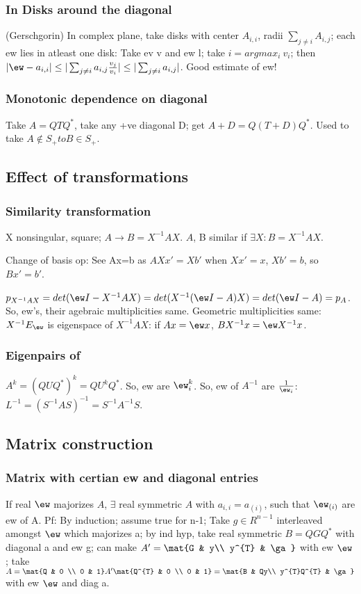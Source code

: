 \documentclass[oneside, article]{memoir}
\begin{document}
\subsubsection{In Disks around the diagonal}
(Gerschgorin) In complex plane, take disks with center $A_{i,i}$, radii $\sum_{j\neq i} A_{i,j}$; each ew lies in atleast one disk: Take ev v and ew l; take $i = argmax_{i}\ v_{i}$; then $|\ew-a_{i,i}|\leq |\sum_{j\neq i}a_{i,j}\frac{v_{j}}{v_{i}}| \leq |\sum_{j\neq i}a_{i,j}|$. Good estimate of ew!

\subsubsection{Monotonic dependence on diagonal}
Take $A = QTQ^{*}$, take any +ve diagonal D; get $A+D = Q(T+D)Q^{*}$. Used to take $A \notin S_+ to B \in S_+$.

\subsection{Effect of transformations}
\subsubsection{Similarity transformation}
X nonsingular, square; $A \to B = X^{-1}AX$. $A$, B similar if $\exists X: B=X^{-1}AX$.

Change of basis op: See Ax=b as $AXx'=Xb'$ when $Xx'=x$, $Xb'=b$, so $Bx'=b'$.

$p_{X^{-1}AX} = det(\ew I - X^{-1}AX) = det(X^{-1}(\ew I - A)X) = det(\ew I - A) = p_{A}$. So, ew's, their agebraic multiplicities same. Geometric multiplicities same: $X^{-1}E_{\ew}$ is eigenspace of $X^{-1}AX$: if $Ax = \ew x$, $BX^{-1}x = \ew X^{-1}x$.

\subsubsection{Eigenpairs of }
$A^{k} = (QUQ^{*})^{k} = QU^{k}Q^{*}$. So, ew are $\ew_{i}^{k}$. So, ew of $A^{-1}$ are $\frac{1}{\ew_{i}}$: $L^{-1} = (S^{-1}AS)^{-1} = S^{-1}A^{-1}S$.

\subsection{Matrix construction}
\subsubsection{Matrix with certian ew and diagonal entries}
If real $\ew$ majorizes $A$, $\exists$ real symmetric $A$ with $a_{i,i} = a_{(i)}$, such that $\ew_{(i)}$ are ew of A. Pf: By induction; assume true for n-1; Take $g \in R^{n-1}$ interleaved amongst $\ew$ which majorizes a; by ind hyp, take real symmetric $B = QGQ^{*}$ with diagonal a and ew g; can make $A' = \mat{G & y\\ y^{T} & \ga}$ with ew $\ew$; take $A = \mat{Q & 0 \\ 0 & 1}A'\mat{Q^{T} & 0 \\ 0 & 1} = \mat{B & Qy\\ y^{T}Q^{T} & \ga}$ with ew $\ew$ and diag a.
\end{document}
